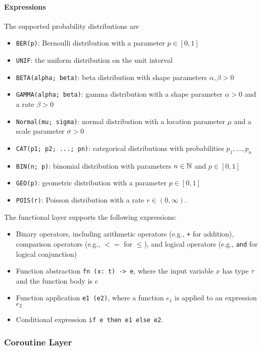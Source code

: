 \paragraph{Expressions}

The supported probability distributions are
\begin{itemize}
  \item \texttt{BER(p)}: Bernoulli distribution with a parameter $p \in [0, 1]$
  \item \texttt{UNIF}: the uniform distribution on the unit interval
  \item \texttt{BETA(alpha; beta)}: beta distribution with shape parameters
        $\alpha, \beta > 0$
  \item \texttt{GAMMA(alpha; beta)}: gamma distribution with a shape parameter
        $\alpha > 0$ and a rate $\beta > 0$
  \item \texttt{Normal(mu; sigma)}: normal distribution with a location
        parameter $\mu$ and a scale parameter $\sigma >0$
  \item \texttt{CAT(p1; p2; ...; pn)}: categorical distributions with
        probabilities $p_1, \ldots, p_n$
  \item \texttt{BIN(n; p)}: binomial distribution with parameters $n \in \mathbb{N}$
        and $p \in [0, 1]$
  \item \texttt{GEO(p)}: geometric distribution with a parameter $p \in [0, 1]$
  \item \texttt{POIS(r)}: Poisson distribution with a rate $r \in (0, \infty)$.
\end{itemize}

The functional layer supports the following expressions:
\begin{itemize}
  \item Binary operators, including arithmetic operators (e.g., \texttt{+} for
        addition), comparison operators (e.g., $<=$ for $\leq$), and logical
        operators (e.g., \texttt{and} for logical conjunction)
  \item Function abstraction \texttt{fn (x: t) -> e}, where the input variable
        $x$ has type $\tau$ and the function body is $e$
  \item Function application \texttt{e1 (e2)}, where a function $e_1$ is applied
        to an expression $e_2$
  \item Conditional expression \texttt{if e then e1 else e2}.
\end{itemize}

\subsubsection{Coroutine Layer}

